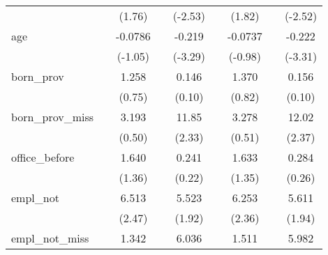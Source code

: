 {\begin{tabular}{l*{8}{c}}
            &                     &      (1.76)         &                     &     (-2.53)         &                     &      (1.82)         &                     &     (-2.52)         \\
[1em]
age         &                     &     -0.0786         &                     &      -0.219\sym{**} &                     &     -0.0737         &                     &      -0.222\sym{***}\\
            &                     &     (-1.05)         &                     &     (-3.29)         &                     &     (-0.98)         &                     &     (-3.31)         \\
[1em]
born\_prov   &                     &       1.258         &                     &       0.146         &                     &       1.370         &                     &       0.156         \\
            &                     &      (0.75)         &                     &      (0.10)         &                     &      (0.82)         &                     &      (0.10)         \\
[1em]
born\_prov\_miss&                     &       3.193         &                     &       11.85\sym{*}  &                     &       3.278         &                     &       12.02\sym{*}  \\
            &                     &      (0.50)         &                     &      (2.33)         &                     &      (0.51)         &                     &      (2.37)         \\
[1em]
office\_before&                     &       1.640         &                     &       0.241         &                     &       1.633         &                     &       0.284         \\
            &                     &      (1.36)         &                     &      (0.22)         &                     &      (1.35)         &                     &      (0.26)         \\
[1em]
empl\_not    &                     &       6.513\sym{*}  &                     &       5.523         &                     &       6.253\sym{*}  &                     &       5.611         \\
            &                     &      (2.47)         &                     &      (1.92)         &                     &      (2.36)         &                     &      (1.94)         \\
[1em]
empl\_not\_miss&                     &       1.342         &                     &       6.036         &                     &       1.511         &                     &       5.982         \\

\end{tabular}}
